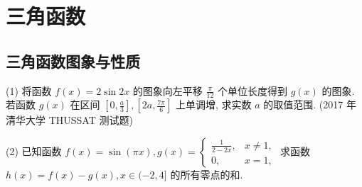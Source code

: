 \chapter{三角函数}
\section{三角函数图象与性质}
\begin{example}
	(1) 将函数 $f(x)=2 \sin 2 x$ 的图象向左平移 $\frac{\pi}{12}$ 个单位长度得到 $g(x)$ 的图象. 若函数 $g(x)$ 在区间 $\left[0, \frac{a}{3}\right],\left[2 a, \frac{7 \pi}{6}\right]$ 上单调增, 求实数 $a$ 的取值范围. (2017 年清华大学 THUSSAT 测试题)

	(2) 已知函数 $f(x)=\sin (\pi x), g(x)=\left\{\begin{array}{ll}\frac{1}{2-2 x}, & x \neq 1, \\ 0, & x=1,\end{array}\right.$ 求函数 $h(x)=f(x)-g(x), x \in(-2,4]$ 的所有零点的和.
\end{example}

